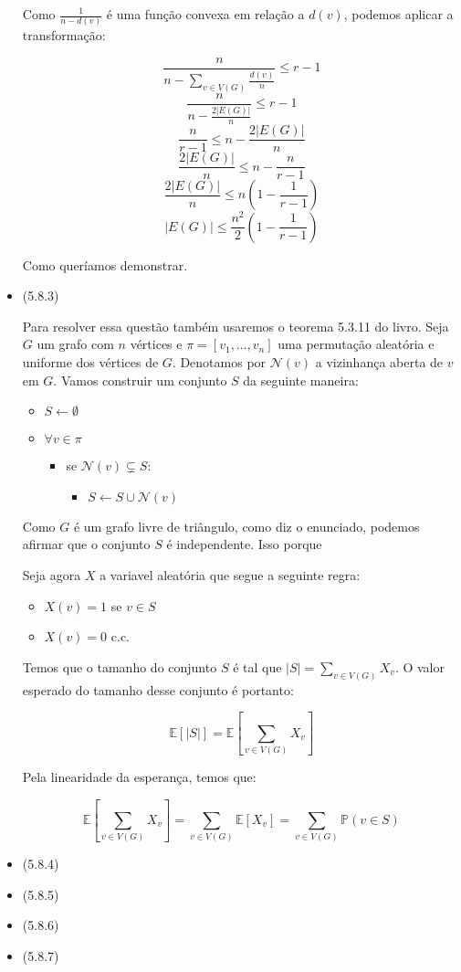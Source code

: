 \documentclass{article}
\begin{document}
\begin{itemize}
	      Como \(\frac{1}{n - d(v)}\) é uma função convexa em relação a \(d(v)\), podemos aplicar a transformação:

	      \[\frac{n}{n - \sum_{v \in V(G)} \frac{d(v)}{n}} \leq r - 1\]
	      \[\frac{n}{n - \frac{2 |E(G)|}{n}} \leq r - 1\]
	      \[\frac{n}{r - 1} \leq n - \frac{2 |E(G)|}{n}\]
	      \[\frac{2 |E(G)|}{n} \leq n - \frac{n}{r - 1}\]
	      \[\frac{2 |E(G)|}{n} \leq n (1 - \frac{1}{r - 1})\]
	      \[|E(G)| \leq \frac{n^2}{2} (1 - \frac{1}{r - 1})\]

	      Como queríamos demonstrar.

	\item (5.8.3)

	      Para resolver essa questão também usaremos o teorema 5.3.11 do livro. Seja \(G\) um grafo com \(n\) vértices e \(\pi = [v_1, \dots, v_{n}]\) uma permutação
	      aleatória e uniforme dos vértices de \(G\). Denotamos por \(\mathcal{N}(v)\) a vizinhança aberta de \(v\) em \(G\). Vamos construir um conjunto \(S\) da seguinte maneira:

	      \begin{itemize}
		      \item \(S \gets \emptyset\)
		      \item \(\forall v \in \pi\)
		            \begin{itemize}
			            \item se \(\mathcal{N}(v) \subsetneq S\):
			                  \begin{itemize}
				                  \item \(S \gets S \cup \mathcal{N}(v)\)
			                  \end{itemize}
		            \end{itemize}
	      \end{itemize}

	      Como \(G\) é um grafo livre de triângulo, como diz o enunciado, podemos afirmar que o conjunto \(S\) é independente. Isso porque

	      Seja agora \(X\) a variavel aleatória que segue a seguinte regra:

	      \begin{itemize}
		      \item \(X(v) = 1\) se \(v \in S\)
		      \item \(X(v) = 0\) c.c.
	      \end{itemize}

	      Temos que o tamanho do conjunto \(S\) é tal que \(|S| = \sum_{v \in V(G)} X_v\). O valor esperado do tamanho desse conjunto é portanto:

	      \[\mathbb{E}[|S|] = \mathbb{E}[\sum_{v \in V(G)} X_v]\]

	      Pela linearidade da esperança, temos que:

	      \[\mathbb{E}[\sum_{v \in V(G)} X_v] = \sum_{v \in V(G)} \mathbb{E}[X_v] = \sum_{v \in V(G)} \mathbb{P}(v \in S)\]

	\item (5.8.4)
	\item (5.8.5)
	\item (5.8.6)
	\item (5.8.7)
\end{itemize}
\end{document}
